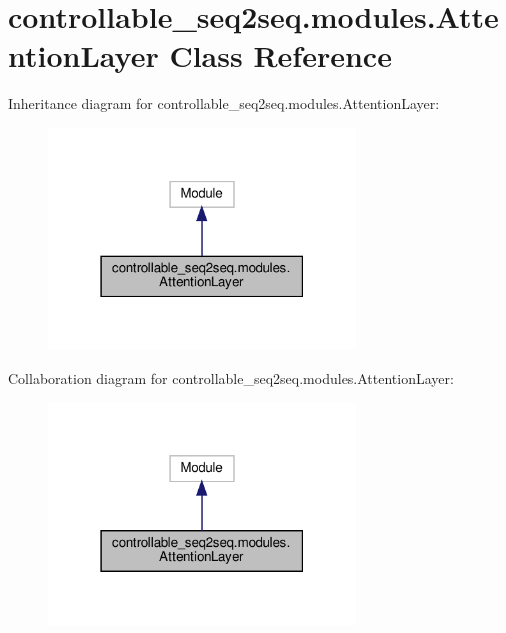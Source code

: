 \hypertarget{classcontrollable__seq2seq_1_1modules_1_1AttentionLayer}{}\section{controllable\+\_\+seq2seq.\+modules.\+Attention\+Layer Class Reference}
\label{classcontrollable__seq2seq_1_1modules_1_1AttentionLayer}


Inheritance diagram for controllable\+\_\+seq2seq.\+modules.\+Attention\+Layer\+:
\nopagebreak
\begin{figure}[H]
\begin{center}
\leavevmode
\includegraphics[width=231pt]{classcontrollable__seq2seq_1_1modules_1_1AttentionLayer__inherit__graph}
\end{center}
\end{figure}


Collaboration diagram for controllable\+\_\+seq2seq.\+modules.\+Attention\+Layer\+:
\nopagebreak
\begin{figure}[H]
\begin{center}
\leavevmode
\includegraphics[width=231pt]{classcontrollable__seq2seq_1_1modules_1_1AttentionLayer__coll__graph}
\end{center}
\end{figure}
